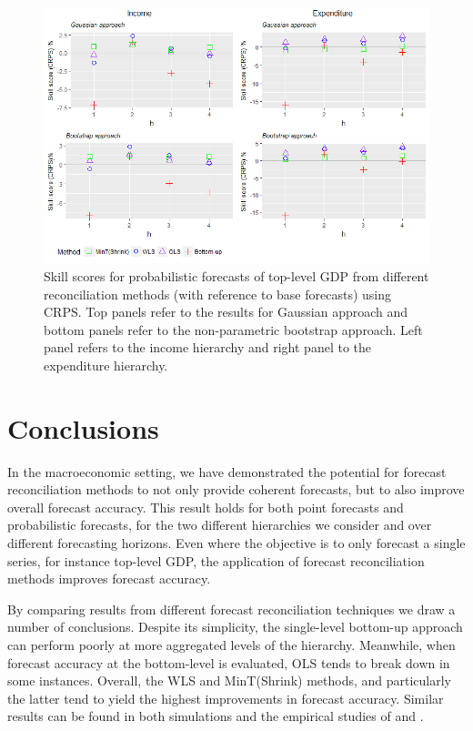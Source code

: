 \documentclass[graybox]{svmult}
\begin{document}
\begin{figure}
	\centering
	\small
	\includegraphics[width=\textwidth]{Figs/Results/ProbF_UnivS.png}
	\caption{Skill scores for probabilistic forecasts of top-level GDP from different reconciliation methods (with reference to base forecasts) using CRPS. Top panels refer to the results for Gaussian approach and bottom panels refer to the non-parametric bootstrap approach. Left panel refers to the income hierarchy and right panel to the expenditure hierarchy.}
	\label{fig: Prob-forecasts-SS_CRPS}
\end{figure}

\section{Conclusions}\label{sec:conclusions}

In the macroeconomic setting, we have demonstrated the potential for forecast reconciliation methods to not only provide coherent forecasts, but to also improve overall forecast accuracy. This result holds for both point forecasts and probabilistic forecasts, for the two different hierarchies we consider and over different forecasting horizons. Even where the objective is to only forecast a single series, for instance top-level GDP, the application of forecast reconciliation methods improves forecast accuracy.

By comparing results from different forecast reconciliation techniques we draw a number of conclusions. Despite its simplicity, the single-level bottom-up approach can perform poorly at more aggregated levels of the hierarchy. Meanwhile, when forecast accuracy at the bottom-level is evaluated, OLS tends to break down in some instances. Overall, the WLS and MinT(Shrink) methods, and particularly the latter tend to yield the highest improvements in forecast accuracy. Similar results can be found in both simulations and the empirical studies of \citet{AthEtAl2017} and \citet{WicEtAl2019}.
\end{document}
